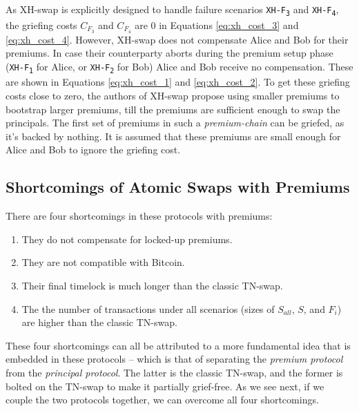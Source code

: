 As XH-swap is explicitly designed to handle failure scenarios \texttt{XH-F\textsubscript{3}} and \texttt{XH-F\textsubscript{4}}, the griefing costs $C_{F_3}$ and $C_{F_4}$ are 0 in Equations \ref{eq:xh_cost_3} and \ref{eq:xh_cost_4}. However, XH-swap does not compensate Alice and Bob for their premiums. In case their counterparty aborts during the premium setup phase (\texttt{XH-F\textsubscript{1}} for Alice, or \texttt{XH-F\textsubscript{2}} for Bob) Alice and Bob receive no compensation. These are shown in Equations \ref{eq:xh_cost_1} and \ref{eq:xh_cost_2}. To get these griefing costs close to zero, the authors of XH-swap propose using smaller premiums to bootstrap larger premiums, till the premiums are sufficient enough to swap the principals. The first set of premiums in such a \textit{premium-chain} can be griefed, as it's backed by nothing. It is assumed that these premiums are small enough for Alice and Bob to ignore the griefing cost.

\subsection{Shortcomings of Atomic Swaps with Premiums} \label{section:shortcomings}
There are four shortcomings in these protocols with premiums: 
\begin{enumerate}
    \item They do not compensate for locked-up premiums.
    \item They are not compatible with Bitcoin.
    \item Their final timelock is much longer than the classic TN-swap.
    \item The the number of transactions under all scenarios (sizes of $S_{all}$, $S$, and $F_{i}$) are higher than the classic TN-swap.
\end{enumerate}

\noindent
These four shortcomings can all be attributed to a more fundamental idea that is embedded in these protocols -- which is that of separating the \textit{premium protocol} from the \textit{principal protocol}. The latter is the classic TN-swap, and the former is bolted on the TN-swap to make it partially grief-free. As we see next, if we couple the two protocols together, we can overcome all four shortcomings.

